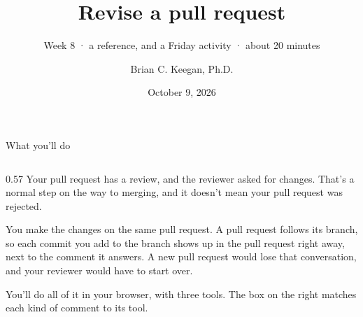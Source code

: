 \documentclass{handout}
\title[INFO 4617 · Week 8 · Revise a pull request]{Revise a pull request}
\subtitle{Week 8 · a reference, and a Friday activity · about 20 minutes}
\author{Brian C. Keegan, Ph.D.}
\institute{Department of Information Science, University of Colorado Boulder}
\date{October 9, 2026}
\begin{document}
\maketitle

\begin{frame}{What you'll do}
  \begin{columns}[T]
    \begin{column}{0.57\textwidth}
      \setlength{\parskip}{4pt}%
      Your pull request has a review, and the reviewer asked for changes.
      That's a normal step on the way to merging, and it doesn't mean your
      pull request was rejected.

      You make the changes on the same pull request. A pull request follows
      its branch, so each commit you add to the branch shows up in the pull
      request right away, next to the comment it answers. A new pull request
      would lose that conversation, and your reviewer would have to start
      over.

      You'll do all of it in your browser, with three tools. The box on the
      right matches each kind of comment to its tool.


\end{column}
\end{columns}
\end{frame}
\end{document}
